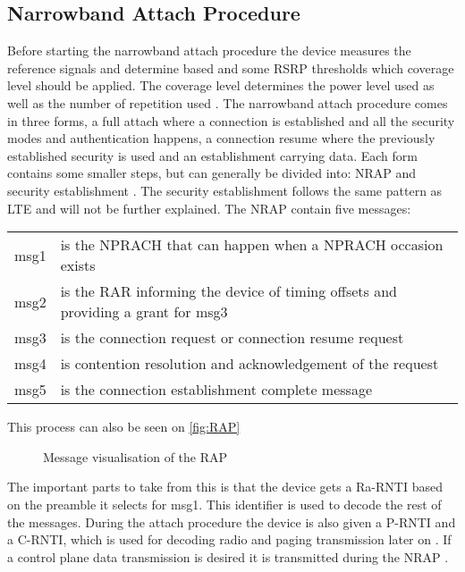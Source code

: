 \subsection{Narrowband Attach Procedure} \label{sec:RAP}
Before starting the narrowband attach procedure the device measures the reference signals and determine based and some \gls{RSRP} thresholds which coverage level should be applied. The coverage level determines the power level used as well as the number of repetition used \citep{NB-IoT_Book}. The narrowband attach procedure comes in three forms, a full attach where a connection is established and all the security modes and authentication happens, a connection resume where the previously established security is used and an establishment carrying data. Each form contains some smaller steps, but can generally be divided into: \gls{NRAP} and security establishment \citep{REL-13}. The security establishment follows the same pattern as LTE and will not be further explained. The \gls{NRAP} contain five messages:
\begin{tabular}{ll}
msg1 & is the NPRACH that can happen when a NPRACH occasion exists \\
msg2 & is the \gls{RAR} informing the device of timing offsets and providing a grant for msg3 \\
msg3 & is the connection request or connection resume request \\
msg4 & is contention resolution and acknowledgement of the request \\
msg5 & is the connection establishment complete message\\
\end{tabular}

This process can also be seen on \autoref{fig:RAP}


\begin{figure}[H]
\centering
%
\caption{Message visualisation of the \gls{RAP}}
\label{fig:RAP}
\end{figure}

The important parts to take from this is that the device gets a \gls{Ra-RNTI} based on the preamble it selects for msg1. This identifier is used to decode the rest of the messages. During the attach procedure the device is also given a \gls{P-RNTI} and a \gls{C-RNTI}, which is used for decoding radio and paging transmission later on \citep{whitepaper}. If a control plane data transmission is desired it is transmitted during the \gls{NRAP} \citep{primer}.


